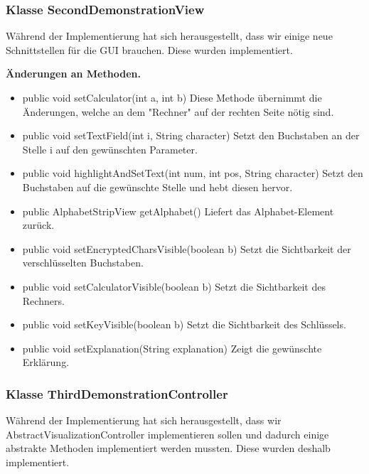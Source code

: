 \documentclass{article}
\begin{document}
    \subsubsection{Klasse SecondDemonstrationView}
	Während der Implementierung hat sich herausgestellt, dass wir einige neue Schnittstellen für die GUI brauchen. Diese wurden implementiert.\newline
           
    \textbf{Änderungen an Methoden.}
      \begin{itemize}
        \item public void setCalculator(int a, int b)\newline
              Diese Methode übernimmt die Änderungen, welche an dem "Rechner" auf der rechten Seite nötig sind.
        \item public void setTextField(int i, String character)\newline
              Setzt den Buchstaben an der Stelle i auf den gewünschten Parameter.
		\item public void highlightAndSetText(int num, int pos, String character)\newline
              Setzt den Buchstaben auf die gewünschte Stelle und hebt diesen hervor.
		\item public AlphabetStripView getAlphabet()\newline
              Liefert das Alphabet-Element zurück.
		\item public void setEncryptedCharsVisible(boolean b)\newline
              Setzt die Sichtbarkeit der verschlüsselten Buchstaben.
		\item public void setCalculatorVisible(boolean b)\newline
              Setzt die Sichtbarkeit des Rechners.
		\item public void setKeyVisible(boolean b)\newline
              Setzt die Sichtbarkeit des Schlüssels.
		\item public void setExplanation(String explanation)\newline
              Zeigt die gewünschte Erklärung.
	  \end{itemize}

    \subsubsection{Klasse ThirdDemonstrationController}
	Während der Implementierung hat sich herausgestellt, dass wir AbstractVisualizationController implementieren sollen und dadurch 
	einige abstrakte Methoden implementiert werden mussten. Diese wurden deshalb implementiert.\newline
           
\end{document}
